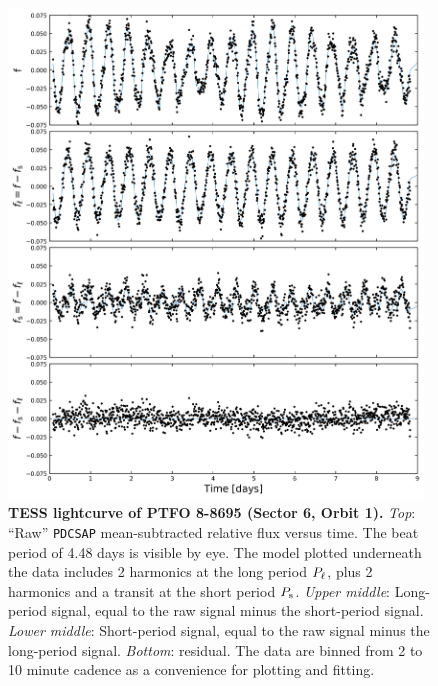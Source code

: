 \documentclass[12pt,twocolumn,tighten]{aastex62}
\begin{document}
\begin{figure}[t]
	\begin{center}
		\leavevmode
		\includegraphics[width=0.98\textwidth]{f1.png}
	\end{center}
	\vspace{-0.7cm}
	\caption{ {\bf TESS lightcurve of PTFO 8-8695 (Sector 6, Orbit 1).}
	{\it Top}: ``Raw'' \texttt{PDCSAP} mean-subtracted relative flux versus time. The beat period of 4.48 days is visible by eye.
	The model plotted underneath the data includes 2 harmonics at the long
	period $P_{\rm \ell}$, plus 2 harmonics and a transit at the short period $P_{\rm s}$.
	{\it Upper middle}: Long-period signal, equal to the raw signal minus the short-period signal.
	{\it Lower middle}: Short-period signal, equal to the raw signal minus the long-period signal.
	{\it Bottom}: residual.
	The data are binned from 2 to 10 minute cadence as a convenience for plotting and fitting.
		\label{fig:splitsignal}
	}
\end{figure}
\end{document}

